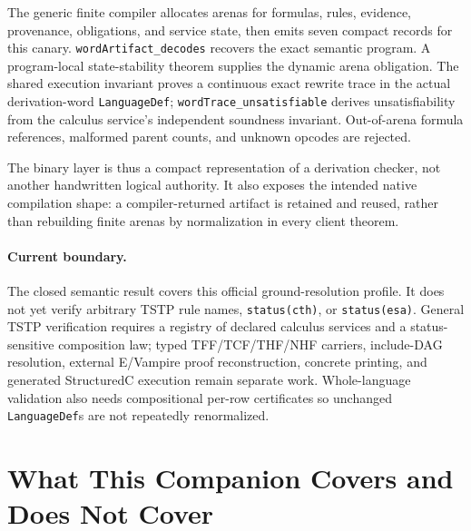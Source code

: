 \documentclass[11pt]{article}
\newcommand{\code}[1]{\texttt{#1}}
\begin{document}
The generic finite compiler allocates arenas for formulas, rules, evidence,
provenance, obligations, and service state, then emits seven compact records
for this canary.  \code{wordArtifact\_decodes} recovers the exact semantic
program.  A program-local state-stability theorem supplies the dynamic arena
obligation.  The shared execution invariant proves a continuous exact
rewrite trace in the actual derivation-word \code{LanguageDef};
\code{wordTrace\_unsatisfiable} derives unsatisfiability from the
calculus service's independent soundness invariant.  Out-of-arena formula
references, malformed parent counts, and unknown opcodes are rejected.

The binary layer is thus a compact representation of a derivation checker,
not another handwritten logical authority.  It also exposes the intended
native compilation shape: a compiler-returned artifact is retained and
reused, rather than rebuilding finite arenas by normalization in every
client theorem.

\paragraph{Current boundary.}
The closed semantic result covers this official ground-resolution profile.
It does not yet verify arbitrary TSTP rule names, \code{status(cth)}, or
\code{status(esa)}.  General TSTP verification requires a registry of
declared calculus services and a status-sensitive composition law; typed
TFF/TCF/THF/NHF carriers, include-DAG resolution, external E/Vampire proof
reconstruction, concrete printing, and generated StructuredC execution
remain separate work.  Whole-language validation also needs compositional
per-row certificates so unchanged \code{LanguageDef}s are not repeatedly
renormalized.

\section{What This Companion Covers and Does Not Cover}
\end{document}
